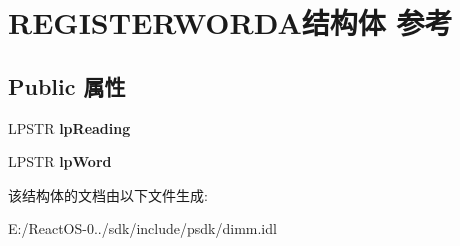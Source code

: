 \hypertarget{struct_r_e_g_i_s_t_e_r_w_o_r_d_a}{}\section{R\+E\+G\+I\+S\+T\+E\+R\+W\+O\+R\+D\+A结构体 参考}
\label{struct_r_e_g_i_s_t_e_r_w_o_r_d_a}
\subsection*{Public 属性}
\begin{DoxyCompactItemize}
\item 
\mbox{\label{struct_r_e_g_i_s_t_e_r_w_o_r_d_a_a517dc7725e2b5f40ac604d7284d2469e}} 
L\+P\+S\+TR {\bfseries lp\+Reading}
\item 
\mbox{\label{struct_r_e_g_i_s_t_e_r_w_o_r_d_a_ab4eefd9bac6129aed2228400bc9cf8ba}} 
L\+P\+S\+TR {\bfseries lp\+Word}
\end{DoxyCompactItemize}


该结构体的文档由以下文件生成\+:\begin{DoxyCompactItemize}
\item 
E\+:/\+React\+O\+S-\/0../sdk/include/psdk/dimm.\+idl\end{DoxyCompactItemize}
